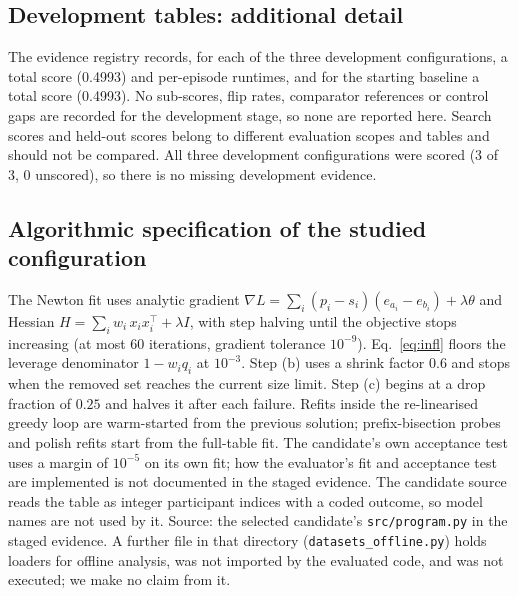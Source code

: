 \documentclass{article}
\begin{document}
\subsection{Development tables: additional detail}
The evidence registry records, for each of the three development configurations, a total score (0.4993) and per-episode runtimes, and for the starting baseline a total score (0.4993). No sub-scores, flip rates, comparator references or control gaps are recorded for the development stage, so none are reported here. Search scores and held-out scores belong to different evaluation scopes and tables and should not be compared. All three development configurations were scored (3 of 3, 0 unscored), so there is no missing development evidence. %

\subsection{Algorithmic specification of the studied configuration}
The Newton fit uses analytic gradient $\nabla L=\sum_i (p_i-s_i)(e_{a_i}-e_{b_i})+\lambda\theta$ and Hessian $H=\sum_i w_i\,x_ix_i^\top+\lambda I$, with step halving until the objective stops increasing (at most 60 iterations, gradient tolerance $10^{-9}$). Eq.~\eqref{eq:infl} floors the leverage denominator $1-w_iq_i$ at $10^{-3}$. Step (b) uses a shrink factor $0.6$ and stops when the removed set reaches the current size limit. Step (c) begins at a drop fraction of $0.25$ and halves it after each failure. Refits inside the re-linearised greedy loop are warm-started from the previous solution; prefix-bisection probes and polish refits start from the full-table fit. The candidate's own acceptance test uses a margin of $10^{-5}$ on its own fit; how the evaluator's fit and acceptance test are implemented is not documented in the staged evidence. The candidate source reads the table as integer participant indices with a coded outcome, so model names are not used by it. Source: the selected candidate's \texttt{src/program.py} in the staged evidence. A further file in that directory (\texttt{datasets\_offline.py}) holds loaders for offline analysis, was not imported by the evaluated code, and was not executed; we make no claim from it.
\end{document}
